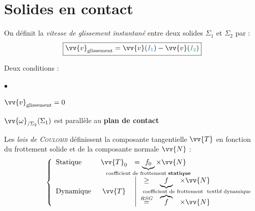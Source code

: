 \documentclass[11pt,a4paper,fleqn,pdftex]{report}
\begin{document}
\section{Solides en contact}
\begin{minipage}{7cm}
On définit la \emph{vitesse de glissement instantané} entre deux solides $\Sigma_1$ et $\Sigma_2$ par : 
\begin{equation}\label{eq:Glissement}\boxed{\vv{v}_{\text{glissement}}=\vv{v}(\textcolor{RoyalBlue}{I_1})-\vv{v}(\textcolor{ForestGreen}{I_2})}\end{equation}
\end{minipage}\hspace{1.5cm}
\begin{minipage}{5cm}
\end{minipage}
\begin{dfn}
Deux conditions : 
\begin{list}{$\bullet$}{ }
\item $\vv{v}_{\text{glissement}}=0$
\item $\vv{\omega}_{/\Sigma_2}(\Sigma_1)$ est parallèle au \textbf{plan de contact}
\end{list}
%
\end{dfn}
\begin{itheorem}
   Les \emph{lois de \textsc{Coulomb}} définissent la composante tangentielle $\vv{T}$ en fonction du frottement solide et de la composante normale $\vv{N}$ : \\
    \begin{equation}
      \left\lbrace
      \begin{array}{l c l}
      \text{Statique }&\vv{T}_0&=\underbrace{f_0}_{\mathclap{\text{coefficient de frottement \textbf{statique}}}}\times\vv{N}\\
      \text{Dynamique }&\vv{T}&
      \left|
      \begin{array}{c c l}
      \ge&\underbrace{f}_{\mathclap{\text{\hspace{3cm}coefficient de frottement \ textbf{ dynamique}}}}&\times\vv{N}\\
      \overset{RSG}{=}&\overbrace{f}&\times\vv{N}\\
      \end{array}
      \right.
      \end{array}
      \right.
    \end{equation}
\end{itheorem}
\end{document}
